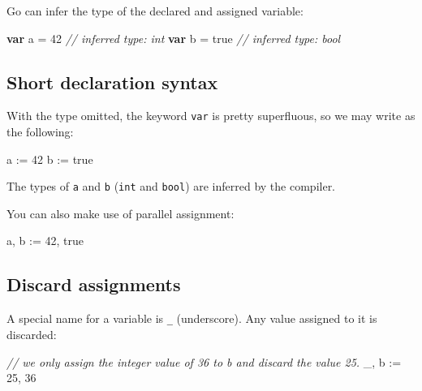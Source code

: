 \documentclass[]{book}
\newenvironment{Shaded}{\begin{snugshade}}{\end{snugshade}}
\newcommand{\CommentTok}[1]{\textcolor[rgb]{0.56,0.35,0.01}{\textit{#1}}}
\newcommand{\DecValTok}[1]{\textcolor[rgb]{0.00,0.00,0.81}{#1}}
\newcommand{\KeywordTok}[1]{\textcolor[rgb]{0.13,0.29,0.53}{\textbf{#1}}}
\newcommand{\NormalTok}[1]{#1}
\newcommand{\OtherTok}[1]{\textcolor[rgb]{0.56,0.35,0.01}{#1}}
\let\BeginKnitrBlock\begin \let\EndKnitrBlock\end
\begin{document}
Go can infer the type of the declared and assigned variable:

\begin{Shaded}
\begin{Highlighting}[]
\KeywordTok{var}\NormalTok{ a = }\DecValTok{42}   \CommentTok{// inferred type: int}
\KeywordTok{var}\NormalTok{ b = }\OtherTok{true} \CommentTok{// inferred type: bool}
\end{Highlighting}
\end{Shaded}

\hypertarget{short-declaration-syntax}{%
\subsection{Short declaration syntax}\label{short-declaration-syntax}}

With the type omitted, the keyword \texttt{var} is pretty superfluous, so we may write
as the following:

\begin{Shaded}
\begin{Highlighting}[]
\NormalTok{a := }\DecValTok{42}
\NormalTok{b := }\OtherTok{true}
\end{Highlighting}
\end{Shaded}

\BeginKnitrBlock{rmdnote}
The types of \texttt{a} and \texttt{b} (\texttt{int} and \texttt{bool}) are inferred by the compiler.
\EndKnitrBlock{rmdnote}

You can also make use of parallel assignment:

\begin{Shaded}
\begin{Highlighting}[]
\NormalTok{a, b := }\DecValTok{42}\NormalTok{, }\OtherTok{true}
\end{Highlighting}
\end{Shaded}

\hypertarget{discard-assignments}{%
\subsection{Discard assignments}\label{discard-assignments}}

A special name for a variable is \texttt{\_} (underscore). Any value assigned to it is
discarded:

\begin{Shaded}
\begin{Highlighting}[]
\CommentTok{// we only assign the integer value of 36 to b and discard the value 25.}
\NormalTok{_, b := }\DecValTok{25}\NormalTok{, }\DecValTok{36}
\end{Highlighting}
\end{Shaded}
\end{document}
